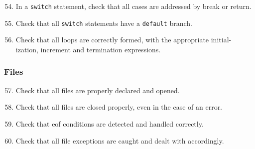 \begin{enumerate}
\setcounter{enumi}{53}

\item In a \texttt{switch} statement, check that all cases are addressed by break or return.

\item Check that all \texttt{switch} statements have a \texttt{default} branch.

\item Check that all loops are correctly formed, with the appropriate initial- ization, increment and termination expressions.

\end{enumerate}

\subsubsection{Files} \label{sssec:files}

\begin{enumerate}
\setcounter{enumi}{56}

\item Check that all files are properly declared and opened.

\item Check that all files are closed properly, even in the case of an error.

\item Check that \acs{eof} conditions are detected and handled correctly.

\item Check that all file exceptions are caught and dealt with accordingly.

\end{enumerate}